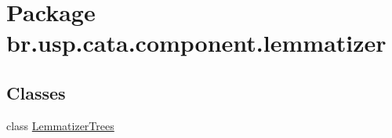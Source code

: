 \hypertarget{namespacebr_1_1usp_1_1cata_1_1component_1_1lemmatizer}{\section{Package br.\+usp.\+cata.\+component.\+lemmatizer}
\label{namespacebr_1_1usp_1_1cata_1_1component_1_1lemmatizer}
}
\subsection*{Classes}
\begin{DoxyCompactItemize}
\item 
class \hyperlink{classbr_1_1usp_1_1cata_1_1component_1_1lemmatizer_1_1_lemmatizer_trees}{Lemmatizer\+Trees}
\end{DoxyCompactItemize}
